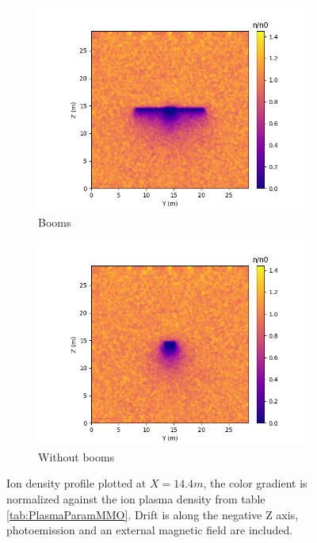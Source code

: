 \begin{figure}[H]
  \begin{subfigure}[b]{0.6\textwidth}
  \includegraphics[width=\textwidth]{figures/MMO/BField/WB/I_BField_WB.png}
  \caption{Booms}
  \label{fig:I_BField_WB}
\end{subfigure}
\begin{subfigure}[b]{0.6\textwidth}
  \includegraphics[width=\textwidth]{figures/MMO/BField/NB/I_BField_NB.png}
  \caption{Without booms}
  \label{fig:I_BField_NB}
\end{subfigure}
\caption{Ion density profile plotted at $X = 14.4 m$, the color gradient is normalized against the ion plasma density from table \ref{tab:PlasmaParamMMO}. Drift is along the negative Z axis, photoemission and an external magnetic field are included.}
\label{fig:Ions_BField}
\end{figure}

